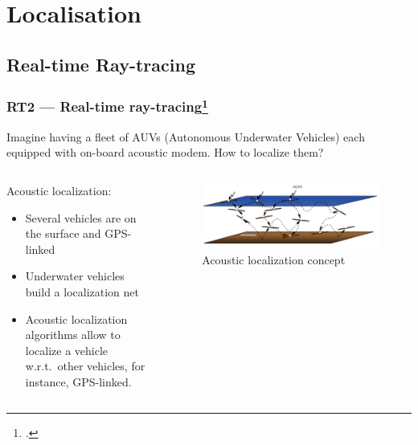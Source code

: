 \documentclass[
    11pt, %
    aspectratio=169, %
]{beamer}
\begin{document}
\section{Localisation}

\subsection{Real-time Ray-tracing}

\begin{frame}
    \frametitle{RT2 --- Real-time ray-tracing\footcite{casalinoRTRealtimeRaytracing2011}}

    Imagine having a fleet of AUVs (Autonomous Underwater Vehicles) each equipped with on-board acoustic modem.
    How to localize them?

    \begin{columns}[t]
        \begin{column}{0.5\textwidth}
            Acoustic localization:
            \begin{itemize}
                \item Several vehicles are on the surface and GPS-linked
                \item Underwater vehicles build a localization net
                \item Acoustic localization algorithms allow to localize a vehicle
                      w.r.t.\ other vehicles, for instance, GPS-linked.
            \end{itemize}
        \end{column}
        \begin{column}{0.5\textwidth}
            \begin{center}
                \begin{figure}
                    \includegraphics[scale=0.3]{assets/rt2-localization.png}
                    \caption{Acoustic localization concept}
                \end{figure}
                
            \end{center}
        \end{column}
    \end{columns}
\end{frame}
\end{document}

